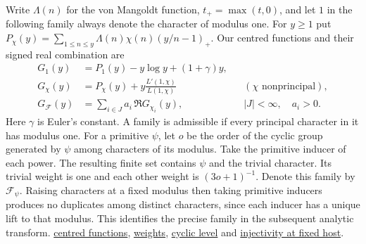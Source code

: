 \documentclass[11pt,a4paper]{article}
\newcommand{\src}[3]{\href{https://github.com/leanprover-community/riemann-hypothesis/blob/40e56bab026552e089d7afcfeff08d2defb9c005/\detokenize{#1}\#L#2}{\textcolor{sourceblue}{#3}}}
\theoremstyle{definition}
\theoremstyle{remark}
\numberwithin{equation}{section}
\begin{document}
Write \(\Lambda(n)\) for the von Mangoldt function, \(t_+=\max(t,0)\), and let \(1\) in the following family always denote the character of modulus one. For \(y\ge1\) put \(P_\chi(y)=\sum_{1\le n\le y}\Lambda(n)\chi(n)(y/n-1)_+\). Our centred functions and their signed real combination are
\begin{equation}\label{eq:centred}
\begin{aligned}
 G_1(y)&=P_1(y)-y\log y+(1+\gamma)y,\\
 G_\chi(y)&=P_\chi(y)+y\frac{L'(1,\chi)}{L(1,\chi)}
                     &&(\chi\text{ nonprincipal}),\\
 G_{\mathcal F}(y)&=\sum_{i\in J}a_i\,\Re G_{\chi_i}(y),
                     && |J|<\infty,\quad a_i>0 .
\end{aligned}
\end{equation}
Here \(\gamma\) is Euler's constant. A family is admissible if every principal character in it has modulus one. For a primitive \(\psi\), let \(o\) be the order of the cyclic group generated by \(\psi\) among characters of its modulus. Take the primitive inducer of each power. The resulting finite set contains \(\psi\) and the trivial character. Its trivial weight is one and each other weight is \((3o+1)^{-1}\). Denote this family by \(\mathcal F_\psi\). Raising characters at a fixed modulus then taking primitive inducers produces no duplicates among distinct characters, since each inducer has a unique lift to that modulus. This identifies the precise family in the subsequent analytic transform. \src{src/Development/AutomorphicArithmetic/DedekindLFunctions/CharFamily.lean}{15}{centred functions}, \src{src/Formalism/SharpRestriction/RamificationFrobenius/TotientGaloisClasses/ExplicitFormulaErrorOfHostConditions.lean}{36}{weights}, \src{src/Formalism/SharpRestriction/RamificationFrobenius/TotientGaloisClasses/ExplicitFormulaErrorOfHostConditions.lean}{105}{cyclic level} and \src{src/Development/AutomorphicArithmetic/PrimitiveCosets/PrimInj.lean}{6}{injectivity at fixed host}.
\end{document}
